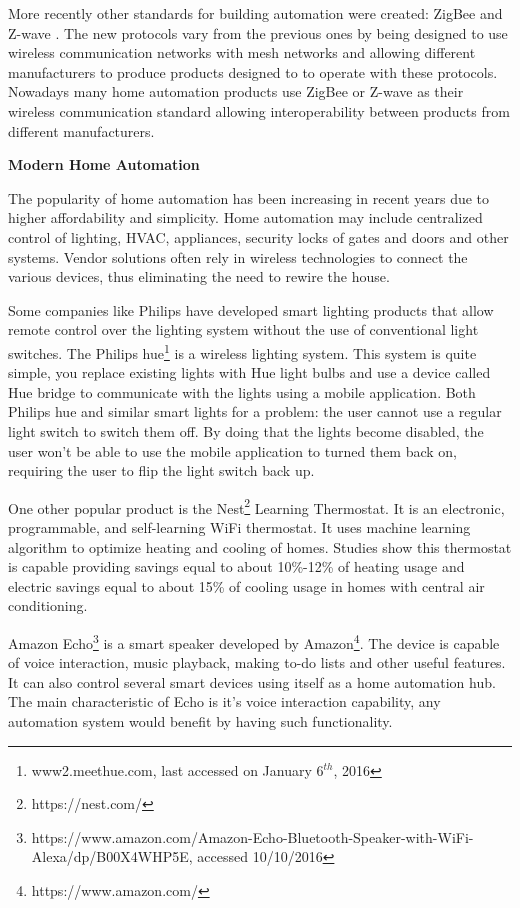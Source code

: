 \documentclass[conference]{IEEEtran}
\begin{document}
More recently other standards for building automation were created: ZigBee \cite{livro_zigbee} and Z-wave \cite{zwave}\cite{zigbeeAndZWave}. The new protocols vary from the previous ones by being designed to use wireless communication networks with mesh networks and allowing different manufacturers to produce products designed to to operate with these protocols. Nowadays many home automation products use ZigBee or Z-wave as their wireless communication standard allowing interoperability between products from different manufacturers.



\textbf{Modern Home Automation}

The popularity of home automation has been increasing in recent years due to higher affordability and simplicity. Home automation may include centralized control of lighting, \ac{HVAC}, appliances, security locks of gates and doors and other systems.
Vendor solutions often rely in wireless technologies to connect the various devices, thus eliminating the need to rewire the house.

Some companies like Philips have developed smart lighting products that allow remote control over the lighting system without the use of conventional light switches. The Philips hue\footnote{www2.meethue.com, last accessed on January 6$^{th}$, 2016} is a wireless lighting system. This system is quite simple, you replace existing lights with Hue light bulbs and use a device called Hue bridge to communicate with the lights using a mobile application. Both Philips hue and similar smart lights for a problem: the user cannot use a regular light switch to switch them off. By doing that the lights become disabled, the user won't be able to use the mobile application to turned them back on, requiring the user to flip the light switch back up.

One other popular product is the Nest\footnote{https://nest.com/} Learning Thermostat. It is an electronic, programmable, and self-learning \ac{WiFi} thermostat. It uses machine learning algorithm to optimize  heating and cooling of homes. Studies\cite{related:nest} show this thermostat is capable providing savings equal to about 10\%-12\% of heating usage and electric savings equal to about 15\% of cooling usage in homes with central air conditioning.

Amazon Echo\footnote{https://www.amazon.com/Amazon-Echo-Bluetooth-Speaker-with-WiFi-Alexa/dp/B00X4WHP5E, accessed 10/10/2016} is a smart speaker developed by Amazon\footnote{https://www.amazon.com/}. The device is capable of voice interaction, music playback, making to-do lists and other useful features. It can also control several smart devices using itself as a home automation hub. The main characteristic of Echo is it's voice interaction capability, any automation system would benefit by having such functionality.
\end{document}
